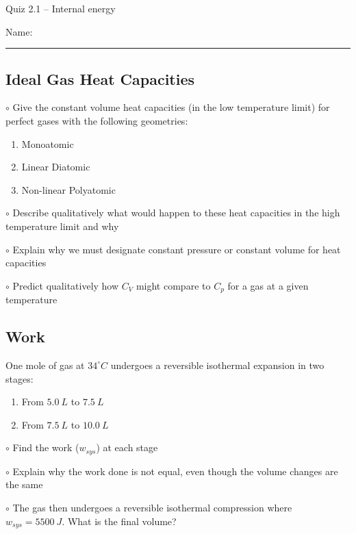 \documentclass[11pt, letterpaper]{memoir}
\begin{document}
	\begin{center}
		{\large Quiz 2.1 --	Internal energy}
	\end{center}
	{\large Name: \rule[-1mm]{4in}{.1pt} 

\subsection*{Ideal Gas Heat Capacities}
$\circ$ Give the constant volume heat capacities (in the low temperature limit) for perfect gases with the following geometries:
\begin{enumerate}
	\item Monoatomic
	
	\vspace{1em}
	\item Linear Diatomic
	
	\vspace{1em}
	\item Non-linear Polyatomic	
\end{enumerate}


\vspace{1em}
\noindent$\circ$ Describe qualitatively what would happen to these heat capacities in the high temperature limit and why

\vspace{5em}
\noindent $\circ$ Explain why we must designate constant pressure or constant volume for heat capacities

\vspace{5em}
\noindent $\circ$ Predict qualitatively how $C_V$ might compare to $C_p$ for a gas at a given temperature

\vspace{15em}
\subsection*{Work}
One mole of gas at $34^\circ C$ undergoes a reversible isothermal expansion in two stages:
\begin{enumerate}
	\item From $5.0~L$ to $7.5~L$
	\item From $7.5~L$ to $10.0~L$
\end{enumerate}
\noindent $\circ$ Find the work ($w_{sys}$) at each stage

\vspace{3em}
\noindent $\circ$ Explain why the work done is not equal, even though the volume changes are the same

\vspace{4em}
\noindent $\circ$ The gas then undergoes a reversible isothermal compression where $w_{sys}=5500~J$. What is the final volume?

}
\end{document}
